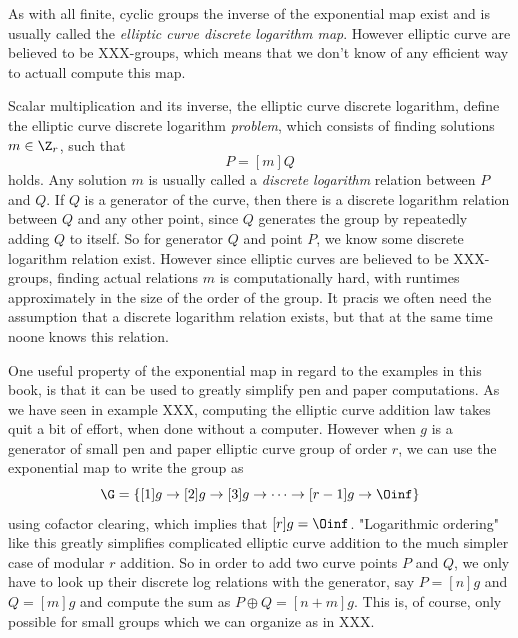 As with all finite, cyclic groups the inverse of the exponential map exist and is usually called the \textit{elliptic curve discrete logarithm map}. However elliptic curve are believed to be XXX-groups, which means that we don't know of any efficient way to actuall compute this map.

Scalar multiplication and its inverse, the elliptic curve discrete logarithm, define the elliptic curve discrete logarithm \textit{problem}, which consists of finding solutions $m\in\Z_r$, such that
\begin{equation}
P = [m]Q
\end{equation}
holds. Any solution $m$ is usually called a \textit{discrete logarithm} relation between $P$ and $Q$. If $Q$ is a generator of the curve, then there is a discrete logarithm relation between $Q$ and any other point, since $Q$ generates the group by repeatedly adding $Q$ to itself. So for generator $Q$ and point $P$, we know some discrete logarithm relation exist. However since elliptic curves are believed to be XXX-groups, finding actual relations $m$ is computationally hard, with runtimes approximately in the size of the order of the group. It pracis we often need the assumption that a discrete logarithm relation exists, but that at the same time noone knows this relation.

One useful property of the exponential map in regard to the examples in this book, is that it can be used to greatly simplify pen and paper computations. As we have seen in example XXX, computing the elliptic curve addition law takes quit a bit of effort, when done without a computer. However when $g$ is a generator of small pen and paper elliptic curve group of order $r$, we can use the exponential map to write the group as
\begin{equation}
\G = \{[1]g\to [2]g \to [3]g\to\cdots\to [r-1]g\to \Oinf\}
\end{equation} 
using cofactor clearing, which implies that $[r]g=\Oinf$. "Logarithmic ordering" like this greatly simplifies complicated elliptic curve addition to the much simpler case of modular $r$ addition. So in order to add two curve points $P$ and $Q$, we only have to look up their discrete log relations with the generator, say $P=[n]g$ and $Q=[m]g$ and compute the sum as $P\oplus Q = [n+m]g$. This is, of course, only possible for small groups which we can organize as in XXX.

